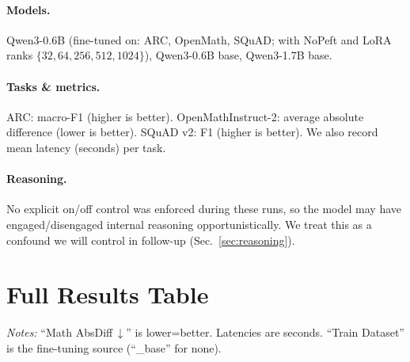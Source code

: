 \documentclass[11pt,a4paper]{article}
\begin{document}
\paragraph{Models.} Qwen3-0.6B (fine-tuned on: ARC, OpenMath, SQuAD; with NoPeft and LoRA ranks $\{32,64,256,512,1024\}$), Qwen3-0.6B base, Qwen3-1.7B base.

\paragraph{Tasks \& metrics.} 
ARC: macro-F1 (higher is better). 
OpenMathInstruct-2: average absolute difference (lower is better). 
SQuAD v2: F1 (higher is better). 
We also record mean latency (seconds) per task.

\paragraph{Reasoning.} No explicit on/off control was enforced during these runs, so the model may have engaged/disengaged internal reasoning opportunistically. We treat this as a confound we will control in follow-up (Sec.~\ref{sec:reasoning}).

\section{Full Results Table}
\label{sec:fulltable}

\noindent\textit{Notes:} ``Math AbsDiff\,$\downarrow$'' is lower=better. Latencies are seconds. ``Train Dataset'' is the fine-tuning source (``\_base'' for none).
\end{document}
